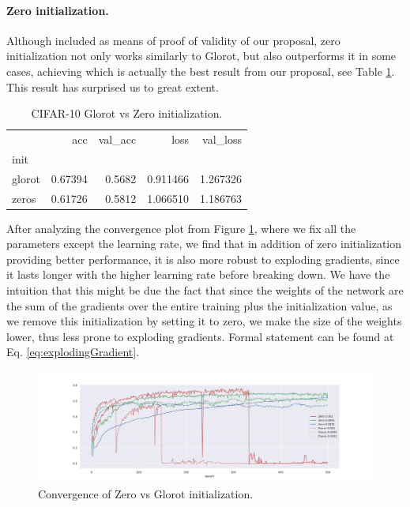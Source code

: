 \paragraph{Zero initialization.} Although included as means of proof of validity of our proposal, zero initialization not only works similarly to Glorot, but also outperforms it in some cases, achieving which is actually the best result from our proposal, see Table \ref{tab:zero_cifar}. This result has surprised us to great extent. 
\begin{table}[h]
\centering
\begin{tabular}{lrrrr}
{} &      acc &  val\_acc &      loss &  val\_loss \\
init   &          &          &           &           \\
glorot &  0.67394 &   0.5682 &  0.911466 &  1.267326 \\
zeros  &  0.61726 &   0.5812 &  1.066510 &  1.186763 \\
\end{tabular}
\caption{CIFAR-10 Glorot vs Zero initialization.}
  \label{tab:zero_cifar}
\end{table}

After analyzing the convergence plot from Figure \ref{fig:zeroConvergence}, where we fix all the parameters except the learning rate, we find that in addition of zero initialization providing better performance, it is also more robust to exploding gradients, since it lasts longer with the higher learning rate before breaking down. We have the intuition that this might be due the fact that since the weights of the network are the sum of the gradients over the entire training plus the initialization value, as we remove this initialization by setting it to zero, we make the size of the weights lower, thus less prone to exploding gradients. Formal statement can be found at Eq. \ref{eq:explodingGradient}.

\begin{figure}[h]\label{fig:zeroConvergence}
  \caption{Convergence of Zero vs Glorot initialization.}
  \centering
    \includegraphics[width=1.0\textwidth]{zeros-vs-glorot}
\end{figure}

